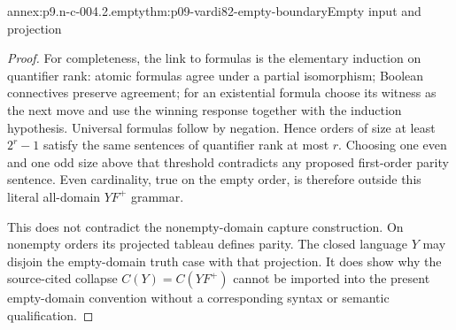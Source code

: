 \begin{annexitem}{annex:p9.n-c-004.2.empty}{thm:p09-vardi82-empty-boundary}{Empty input and projection}
\begin{proof}
For completeness, the link to formulas is the elementary induction on
quantifier rank: atomic formulas agree under a partial isomorphism;
Boolean connectives preserve agreement; for an existential formula choose
its witness as the next move and use the winning response together with
the induction hypothesis. Universal formulas follow by negation. Hence
orders of size at least \(2^r-1\) satisfy the same sentences of
quantifier rank at most \(r\). Choosing one even and one odd size above
that threshold contradicts any proposed first-order parity sentence.
Even cardinality, true on the empty order, is therefore outside this
literal all-domain \(YF^+\) grammar.

This does not contradict the nonempty-domain capture construction. On
nonempty orders its projected tableau defines parity. The closed language
\(Y\) may disjoin the empty-domain truth case with that projection.
It does show why the source-cited collapse \(C(Y)=C(YF^+)\) cannot be
imported into the present empty-domain convention without a corresponding
syntax or semantic qualification.
\end{proof}
\end{annexitem}
